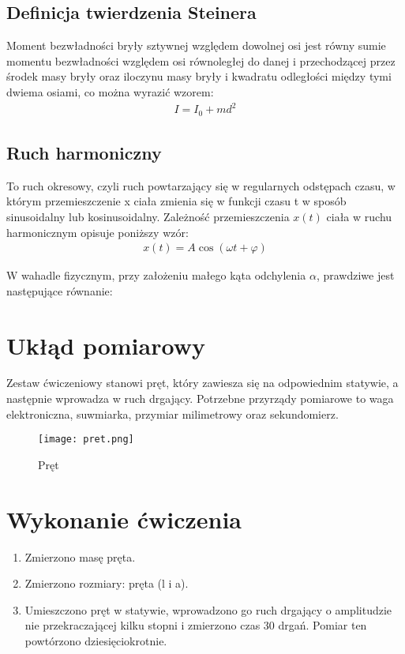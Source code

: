 \documentclass{article}
\begin{document}
\subsection{Definicja twierdzenia Steinera}
Moment bezwładności bryły sztywnej względem dowolnej osi jest równy sumie momentu bezwładności względem osi równoległej do danej i przechodzącej przez środek masy bryły oraz iloczynu masy bryły i kwadratu odległości między tymi dwiema osiami, co można wyrazić wzorem:
\begin{align}
I = I_{0} + md^{2} 
\end{align}

\subsection{Ruch harmoniczny}
To ruch okresowy, czyli ruch powtarzający się w regularnych odstępach czasu, w którym przemieszczenie x ciała zmienia się w funkcji czasu t w sposób sinusoidalny lub kosinusoidalny. Zależność przemieszczenia $x(t)$ ciała w ruchu harmonicznym opisuje poniższy wzór:
\begin{align}
 x(t) = A \cos (\omega t + \varphi)
\end{align}

W wahadle fizycznym, przy założeniu małego kąta odchylenia $\alpha$, prawdziwe jest następujące równanie:


\section{Ukłąd pomiarowy}
Zestaw ćwiczeniowy stanowi pręt, który zawiesza się na odpowiednim statywie, a następnie wprowadza w ruch drgający. Potrzebne przyrządy pomiarowe to waga elektroniczna, suwmiarka, przymiar milimetrowy oraz sekundomierz.
\begin{figure}[!htb]
	\centering
	\texttt{[image: pret.png]}
	\caption{Pręt}
\end{figure}	
\section{Wykonanie ćwiczenia}
\begin{enumerate}
	\item Zmierzono masę pręta.
	\item Zmierzono rozmiary: pręta (l i a).
	\item Umieszczono pręt w statywie, wprowadzono go ruch drgający o amplitudzie nie przekraczającej kilku stopni i zmierzono czas 30 drgań.  Pomiar ten powtórzono dziesięciokrotnie.
\end{enumerate}
	
\end{document}
